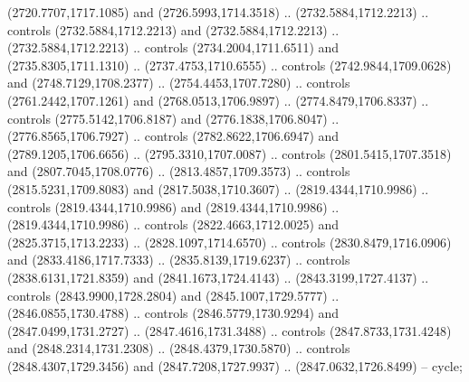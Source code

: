 \begin{scope}[shift={(19.44451,-318.97965)}]
\begin{scope}[shift={(-2093.8013,-1176.4989)}]
\begin{scope}
\begin{scope}
          (2720.7707,1717.1085) and (2726.5993,1714.3518) .. (2732.5884,1712.2213) ..
          controls (2732.5884,1712.2213) and (2732.5884,1712.2213) ..
          (2732.5884,1712.2213) .. controls (2734.2004,1711.6511) and
          (2735.8305,1711.1310) .. (2737.4753,1710.6555) .. controls
          (2742.9844,1709.0628) and (2748.7129,1708.2377) .. (2754.4453,1707.7280) ..
          controls (2761.2442,1707.1261) and (2768.0513,1706.9897) ..
          (2774.8479,1706.8337) .. controls (2775.5142,1706.8187) and
          (2776.1838,1706.8047) .. (2776.8565,1706.7927) .. controls
          (2782.8622,1706.6947) and (2789.1205,1706.6656) .. (2795.3310,1707.0087) ..
          controls (2801.5415,1707.3518) and (2807.7045,1708.0776) ..
          (2813.4857,1709.3573) .. controls (2815.5231,1709.8083) and
          (2817.5038,1710.3607) .. (2819.4344,1710.9986) .. controls
          (2819.4344,1710.9986) and (2819.4344,1710.9986) .. (2819.4344,1710.9986) ..
          controls (2822.4663,1712.0025) and (2825.3715,1713.2233) ..
          (2828.1097,1714.6570) .. controls (2830.8479,1716.0906) and
          (2833.4186,1717.7333) .. (2835.8139,1719.6237) .. controls
          (2838.6131,1721.8359) and (2841.1673,1724.4143) .. (2843.3199,1727.4137) ..
          controls (2843.9900,1728.2804) and (2845.1007,1729.5777) ..
          (2846.0855,1730.4788) .. controls (2846.5779,1730.9294) and
          (2847.0499,1731.2727) .. (2847.4616,1731.3488) .. controls
          (2847.8733,1731.4248) and (2848.2314,1731.2308) .. (2848.4379,1730.5870) ..
          controls (2848.4307,1729.3456) and (2847.7208,1727.9937) ..
          (2847.0632,1726.8499) -- cycle;


\end{scope}
\end{scope}
\end{scope}
\end{scope}
